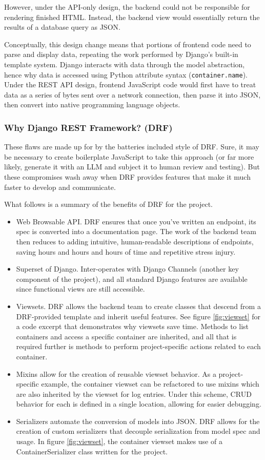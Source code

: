 \documentclass[12pt,titlepage]{article}
\begin{document}
However, under the API-only design, the backend could not be responsible for rendering finished HTML.
Instead, the backend view would essentially return the results of a database query as JSON.

Conceptually, this design change means that portions of frontend code need to parse and display data,
repeating the work performed by Django's built-in template system. Django interacts with data through the model
abstraction, hence why data is accessed using Python attribute syntax (\texttt{container.name}). Under the REST
API design, frontend JavaScript code would first have to treat data as a series of bytes sent over a network connection,
then parse it into JSON, then convert into native programming language objects.

\subsubsection{Why Django REST Framework? (DRF)}
These flaws are made up for by the batteries included style of DRF. Sure, it may be necessary to create boilerplate
JavaScript to take this approach (or far more likely, generate it with an LLM and subject it to human review and testing).
But these compromises wash away when DRF provides features that make it much faster to develop and communicate.

What follows is a summary of the benefits of DRF for the project.

\begin{itemize}
	\item Web Browsable API. DRF ensures that once you've written an endpoint,
		its spec is converted into a documentation page. The work of the backend team
		then reduces to adding intuitive, human-readable descriptions of endpoints, saving
		hours and hours and hours of time and repetitive stress injury.
	\item Superset of Django. Inter-operates with Django Channels (another key component of the project),
		and all standard Django features are available since functional views are still accessible.
	\item Viewsets. DRF allows the backend team to create classes that descend from a DRF-provided template
		and inherit useful features. See figure \ref{fig:viewset} for a code excerpt that demonstrates
		why viewsets save time. Methods to list containers and access a specific container are inherited,
		and all that is required further is methods to perform project-specific actions related to each container.
	\item Mixins allow for the creation of reusable viewset behavior. As a project-specific example, the container
		viewset can be refactored to use mixins which are also inherited by the viewset for log entries. Under
		this scheme, CRUD behavior for each is defined in a single location, allowing for easier debugging.
	\item Serializers automate the conversion of models into JSON. DRF allows for the creation of custom serializers
		that decouple serialization from model spec and usage. In figure \ref{fig:viewset}, the container viewset
		makes use of a ContainerSerializer class written for the project.
\end{itemize}
\end{document}
